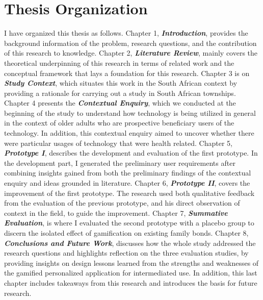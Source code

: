 \section{Thesis Organization}
I have organized this thesis as follows. Chapter 1, \emph{\textbf{Introduction}}, provides the background information of the problem, research questions, and the contribution of this research to knowledge. Chapter 2, \emph{\textbf{Literature Review}}, mainly covers  the theoretical underpinning of this research in terms of related work and the conceptual framework that lays a foundation for this research. Chapter 3 is on \emph{\textbf{Study Context}}, which situates this work in the South African context by providing a rationale for carrying out a study in South African townships. Chapter 4 presents the \emph{\textbf{Contextual Enquiry}}, which we conducted at the beginning of the study to understand how technology is being utilized in general in the context of older adults who are prospective beneficiary users of the technology. In addition, this contextual enquiry aimed to uncover whether there were particular usages of technology that were health related. Chapter 5, \emph{\textbf{Prototype I}}, describes the development and evaluation of the first prototype. In the development part, I generated the preliminary user requirements after combining insights gained from both the preliminary findings of the contextual enquiry and ideas grounded in literature. Chapter 6, \emph{\textbf{Prototype II}}, covers the improvement of the first prototype. The research used both qualitative feedback from the evaluation of the previous prototype, and his direct observation of context in the field, to guide the improvement. Chapter 7, \emph{\textbf{Summative Evaluation}}, is where I evaluated the second prototype with a placebo group to discern the isolated effect of gamification on existing family bonds. Chapter 8, \emph{\textbf{Conclusions and Future Work}}, discusses how the whole study addressed the research questions and highlights reflection on the three evaluation studies, by providing insights on design lessons learned from the strengths and weaknesses of the gamified personalized application for intermediated use. In addition, this last chapter includes takeaways from this research and introduces the basis for future research.         
\begin{flushright}
\end{flushright}
